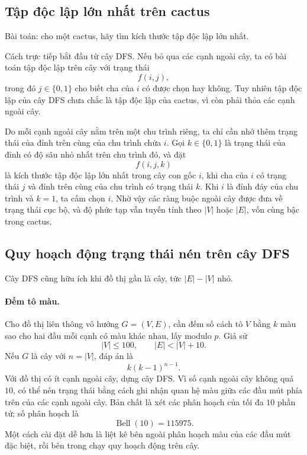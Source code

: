 \documentclass[11pt]{article}
\begin{document}
\subsection{Tập độc lập lớn nhất trên cactus}

Bài toán: cho một cactus, hãy tìm kích thước tập độc lập lớn nhất.

Cách trực tiếp bắt đầu từ cây DFS. Nếu bỏ qua các cạnh ngoài cây, ta có bài
toán tập độc lập trên cây với trạng thái
\[
  f(i,j),
\]
trong đó \(j\in\{0,1\}\) cho biết cha của \(i\) có được chọn hay không. Tuy
nhiên tập độc lập của cây DFS chưa chắc là tập độc lập của cactus, vì còn phải
thỏa các cạnh ngoài cây.

Do mỗi cạnh ngoài cây nằm trên một chu trình riêng, ta chỉ cần nhớ thêm trạng
thái của đỉnh trên cùng của chu trình chứa \(i\). Gọi \(k\in\{0,1\}\) là trạng
thái của đỉnh có độ sâu nhỏ nhất trên chu trình đó, và đặt
\[
  f(i,j,k)
\]
là kích thước tập độc lập lớn nhất trong cây con gốc \(i\), khi cha của \(i\)
có trạng thái \(j\) và đỉnh trên cùng của chu trình có trạng thái \(k\). Khi
\(i\) là đỉnh đáy của chu trình và \(k=1\), ta cấm chọn \(i\). Nhờ vậy các
ràng buộc ngoài cây được đưa về trạng thái cục bộ, và độ phức tạp vẫn tuyến
tính theo \(|V|\) hoặc \(|E|\), vốn cùng bậc trong cactus.

\subsection{Quy hoạch động trạng thái nén trên cây DFS}

Cây DFS cũng hữu ích khi đồ thị gần là cây, tức \(|E|-|V|\) nhỏ.

\paragraph{Đếm tô màu.}
Cho đồ thị liên thông vô hướng \(G=(V,E)\), cần đếm số cách tô \(V\) bằng
\(k\) màu sao cho hai đầu mỗi cạnh có màu khác nhau, lấy modulo \(p\). Giả sử
\[
  |V|\le 100,\qquad |E|<|V|+10.
\]
Nếu \(G\) là cây với \(n=|V|\), đáp án là
\[
  k(k-1)^{n-1}.
\]
Với đồ thị có ít cạnh ngoài cây, dựng cây DFS. Vì số cạnh ngoài cây không quá
\(10\), có thể nén trạng thái bằng cách ghi nhận quan hệ màu giữa các đầu mút
phía trên của các cạnh ngoài cây. Bản chất là xét các phân hoạch của tối đa
\(10\) phần tử; số phân hoạch là
\[
  \operatorname{Bell}(10)=115975.
\]
Một cách cài đặt dễ hơn là liệt kê bên ngoài phân hoạch màu của các đầu mút
đặc biệt, rồi bên trong chạy quy hoạch động trên cây.
\end{document}
